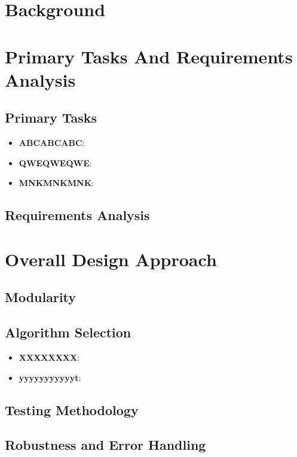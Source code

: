 \documentclass[12pt,a4paper]{article}
\begin{document}
%
%
\section{Background}

%
%
\section{Primary Tasks And Requirements Analysis}

\subsection{Primary Tasks}
\begin{itemize}
    \item \textbf{ABCABCABC}: 
    \item \textbf{QWEQWEQWE}: 
    \item \textbf{MNKMNKMNK}: 
\end{itemize}

\subsection{Requirements Analysis}


%
%
\section{Overall Design Approach}

\subsection{Modularity}

\subsection{Algorithm Selection}
\begin{itemize}
    \item \textbf{XXXXXXXX}:
    \item \textbf{yyyyyyyyyyyt}:
\end{itemize}

\subsection{Testing Methodology}

\subsection{Robustness and Error Handling}
\end{document}

